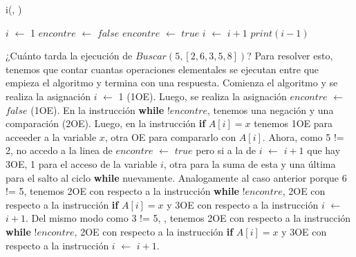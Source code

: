 \documentclass[10pt,a4paper]{article}
\begin{document}
\begin{algorithm}[H]{i(, )}
	\begin{algorithmic}[1]
		\State $i$ $\gets$ 1
            \State $encontre$ $\gets$ $false$
		\State $encontre$ $\gets$ $true$                 
		\State $i$ $\gets$ $i+1$         \EndIf
            \EndWhile
            \State $print(i-1)$ 
		
		\medskip
	\end{algorithmic}
\end{algorithm}
\newpage

¿Cuánto tarda la ejecución de $Buscar(5, [2,6,3,5,8])$?
\newline
\newline
Para resolver esto, tenemos que contar cuantas operaciones elementales se ejecutan entre que empieza el algoritmo y termina con una respuesta. 
\newline
\newline
Comienza el algoritmo y se realiza la asignación $i$ $\gets$ 1 (1OE). Luego, se realiza la asignación $encontre$ $\gets$ $false$ (1OE).
\newline
\newline
En la instrucción \textbf{while} $!encontre$, tenemos una negación y una comparación (2OE). 
\newline
\newline
Luego, en la instrucción \textbf{if} $A[i] = x$ tenemos 1OE para acceeder a la variable $x$, otra OE para compararlo con $A[i]$. Ahora, como 5 != 2, no accedo a la linea de $encontre$ $\gets$ $true$ pero si a la de $i$ $\gets$ $i+1$ que hay 3OE, 1 para el acceso de la variable $i$, otra para la suma de esta y una última para el salto al ciclo \textbf{while} nuevamente. 
\newline
\newline
Analogamente al caso anterior porque 6 != 5, tenemos 2OE con respecto a la instrucción \textbf{while} $!encontre$, 2OE con respecto a la instrucción \textbf{if} $A[i] = x$ y 3OE con respecto a la instrucción $i$ $\gets$ $i+1$. 
\newline
\newline
Del mismo modo como 3 != 5, , tenemos 2OE con respecto a la instrucción \textbf{while} $!encontre$, 2OE con respecto a la instrucción \textbf{if} $A[i] = x$ y 3OE con respecto a la instrucción $i$ $\gets$ $i+1$.
\newline
\newline
\end{document}
